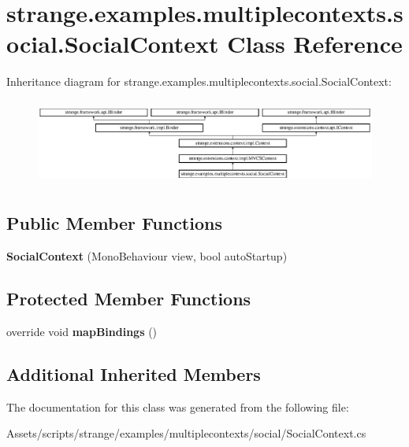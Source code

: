 \hypertarget{classstrange_1_1examples_1_1multiplecontexts_1_1social_1_1_social_context}{\section{strange.\-examples.\-multiplecontexts.\-social.\-Social\-Context Class Reference}
\label{classstrange_1_1examples_1_1multiplecontexts_1_1social_1_1_social_context}
}
Inheritance diagram for strange.\-examples.\-multiplecontexts.\-social.\-Social\-Context\-:\begin{figure}[H]
\begin{center}
\leavevmode
\includegraphics[height=2.845528cm]{classstrange_1_1examples_1_1multiplecontexts_1_1social_1_1_social_context}
\end{center}
\end{figure}
\subsection*{Public Member Functions}
\begin{DoxyCompactItemize}
\item 
\hypertarget{classstrange_1_1examples_1_1multiplecontexts_1_1social_1_1_social_context_a71ee3aafde037c32691a8a4f2a19fc80}{{\bfseries Social\-Context} (Mono\-Behaviour view, bool auto\-Startup)}\label{classstrange_1_1examples_1_1multiplecontexts_1_1social_1_1_social_context_a71ee3aafde037c32691a8a4f2a19fc80}

\end{DoxyCompactItemize}
\subsection*{Protected Member Functions}
\begin{DoxyCompactItemize}
\item 
\hypertarget{classstrange_1_1examples_1_1multiplecontexts_1_1social_1_1_social_context_a5700e661f9237829c64ce594906e9939}{override void {\bfseries map\-Bindings} ()}\label{classstrange_1_1examples_1_1multiplecontexts_1_1social_1_1_social_context_a5700e661f9237829c64ce594906e9939}

\end{DoxyCompactItemize}
\subsection*{Additional Inherited Members}


The documentation for this class was generated from the following file\-:\begin{DoxyCompactItemize}
\item 
Assets/scripts/strange/examples/multiplecontexts/social/Social\-Context.\-cs\end{DoxyCompactItemize}
